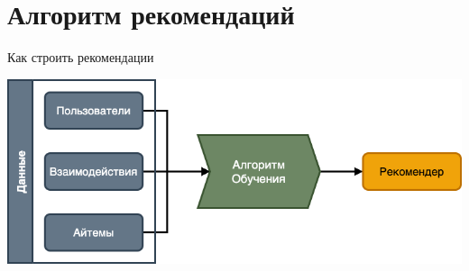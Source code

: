 \documentclass[11pt,aspectratio=169,handout]{beamer}
\begin{document}
\section{Алгоритм рекомендаций}

{
\begin{frame}[plain]
\end{frame}
}

\begin{frame}{Как строить рекомендации}

\begin{center}

\begin{center}
\includegraphics[scale=0.35]{images/learning.png}
\end{center}

\end{center}

\end{frame}
\end{document}
